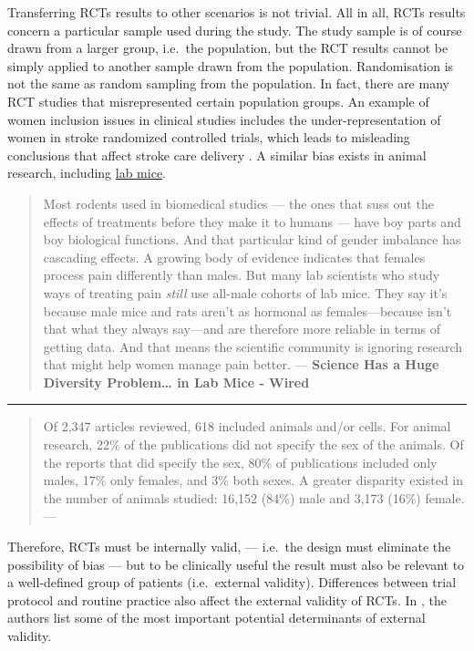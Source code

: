 \documentclass[
]{book}
\begin{document}
Transferring RCTs results to other scenarios is not trivial. All in all, RCTs results concern a particular sample used during the study. The study sample is of course drawn from a larger group, i.e.~the population, but the RCT results cannot be simply applied to another sample drawn from the population. Randomisation is not the same as random sampling from the population. In fact, there are many RCT studies that misrepresented certain population groups. An example of women inclusion issues in clinical studies includes the under-representation of women in stroke randomized controlled trials, which leads to misleading conclusions that affect stroke care delivery \citep{tsivgoulis2017under}. A similar bias exists in animal research, including \href{https://www.wired.com/2016/07/science-huge-diversity-problem-lab-rats/}{lab mice}.

\begin{quote}
Most rodents used in biomedical studies --- the ones that suss out the effects of treatments before they make it to humans --- have boy parts and boy biological functions. And that particular kind of gender imbalance has cascading effects. A growing body of evidence indicates that females process pain differently than males. But many lab scientists who study ways of treating pain \emph{still }use all-male cohorts of lab mice. They say it's because male mice and rats aren't as hormonal as females---because isn't that what they always say---and are therefore more reliable in terms of getting data. And that means the scientific community is ignoring research that might help women manage pain better. --- \textbf{Science Has a Huge Diversity Problem\ldots{} in Lab Mice - Wired}
\end{quote}

\begin{center}\rule{0.5\linewidth}{0.5pt}\end{center}

\begin{quote}
Of 2,347 articles reviewed, 618 included animals and/or cells. For animal research, 22\% of the publications did not specify the sex of the animals. Of the reports that did specify the sex, 80\% of publications included only males, 17\% only females, and 3\% both sexes. A greater disparity existed in the number of animals studied: 16,152 (84\%) male and 3,173 (16\%) female. --- \citep{yoon2014sex}
\end{quote}

Therefore, RCTs must be internally valid, --- i.e.~the design must eliminate the possibility of bias --- but to be clinically useful the result must also be relevant to a well-defined group of patients (i.e.~external validity). Differences between trial protocol and routine practice also affect the external validity of RCTs. In \citep{rothwell2006factors}, the authors list some of the most important potential determinants of external validity.
\end{document}
